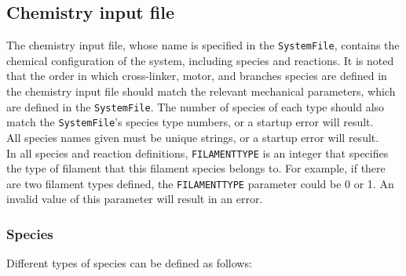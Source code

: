 \documentclass[11pt, oneside]{article}   	%
\begin{document}
\normalsize


\subsection{Chemistry input file}
The chemistry input file, whose name is specified in the \texttt{SystemFile}, contains the chemical configuration of the system, including species and reactions. It is noted that the order in which cross-linker, motor, and branches species are defined in the chemistry input file should match the relevant mechanical parameters, which are defined in the \texttt{SystemFile}. The number of species of each type should also match the \texttt{SystemFile}'s species type numbers, or a startup error will result. \\

\noindent All species names given must be unique strings, or a startup error will result.\\

\noindent In all species and reaction definitions, \texttt{FILAMENTTYPE} is an integer that specifies the type of filament that this filament species belongs to. For example, if there are two filament types defined, the \texttt{FILAMENTTYPE} parameter could be 0 or 1. An invalid value of this parameter will result in an error.

\subsubsection{Species}
Different types of species can be defined as follows:
\end{document}
